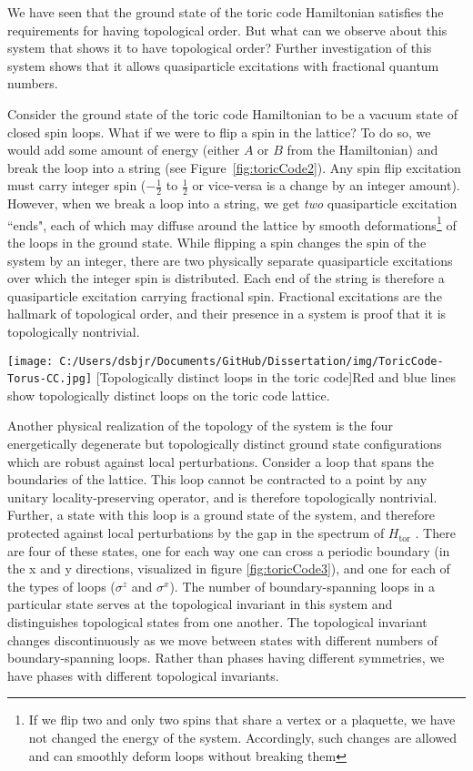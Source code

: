 We have seen that the ground state of the toric code Hamiltonian satisfies the requirements for having topological order. But what can we observe about this system that shows it to have topological order? Further investigation of this system shows that it allows quasiparticle excitations with fractional quantum numbers.

Consider the ground state of the toric code Hamiltonian to be a vacuum state of closed spin loops. What if we were to flip a spin in the lattice? To do so, we would add some amount of energy (either $A$ or $B$ from the Hamiltonian) and break the loop into a string (see Figure~\ref{fig:toricCode2}). Any spin flip excitation must carry integer spin ($-\frac{1}{2}$ to $\frac{1}{2}$ or vice-versa is a change by an integer amount). However, when we break a loop into a string, we get \textit{two} quasiparticle excitation ``ends", each of which may diffuse around the lattice by smooth deformations\footnote{If we flip two and only two spins that share a vertex or a plaquette, we have not changed the energy of the system. Accordingly, such changes are allowed and can smoothly deform loops without breaking them} of the loops in the ground state. While flipping a spin changes the spin of the system by an integer, there are two physically separate quasiparticle excitations over which the integer spin is distributed. Each end of the string is therefore a quasiparticle excitation carrying fractional spin. Fractional excitations are the hallmark of topological order, and their presence in a system is proof that it is topologically nontrivial.

\begin{centering}
\texttt{[image: C:/Users/dsbjr/Documents/GitHub/Dissertation/img/ToricCode-Torus-CC.jpg]}
  \captionsetup{width=0.75\textwidth}
  [Topologically distinct loops in the toric code]{Red and blue lines show topologically distinct loops on the toric code lattice.}
  \label{fig:toricCode3}
\end{centering}

Another physical realization of the topology of the system is the four energetically degenerate but topologically distinct ground state configurations which are robust against local perturbations. Consider a loop that spans the boundaries of the lattice. This loop cannot be contracted to a point by any unitary locality-preserving operator, and is therefore topologically nontrivial. Further, a state with this loop is a ground state of the system, and therefore protected against local perturbations by the gap in the spectrum of $H_{\text{tor}}$ \cite{Bravyi2010}. There are four of these states, one for each way one can cross a periodic boundary (in the x and y directions, visualized in figure \ref{fig:toricCode3}), and one for each of the types of loops ($\sigma^{z}$ and $\sigma^{x}$). The number of boundary-spanning loops in a particular state serves at the topological invariant in this system and distinguishes topological states from one another. The topological invariant changes discontinuously as we move between states with different numbers of boundary-spanning loops. Rather than phases having different symmetries, we have phases with different topological invariants.

